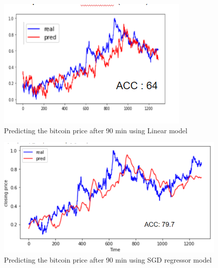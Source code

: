 \documentclass[final]{cvpr}
\begin{document}
\begin{figure}[h!]
\begin{center}
\caption{Predicting the bitcoin price after 90 min using Linear model}
\includegraphics[width=0.8\linewidth]{latex/linear_90.PNG}
\end{center}
\label{fig:linear90}
\end{figure}

\begin{figure}[h!]
\begin{center}
\caption{Predicting the bitcoin price after 90 min using SGD regressor model}
\includegraphics[width=0.8\linewidth]{latex/SGD_90.PNG}
\end{center}
\label{fig:sgd90}
\end{figure}
\end{document}

